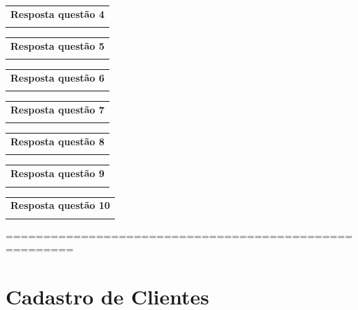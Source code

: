 \documentclass[
]{book}
\begin{document}
\begin{longtable}[]{@{}l@{}}
\toprule\noalign{}
\endhead
\bottomrule\noalign{}
\endlastfoot
\textbf{Resposta questão 4} \\
 \\
\end{longtable}

\begin{longtable}[]{@{}l@{}}
\toprule\noalign{}
\endhead
\bottomrule\noalign{}
\endlastfoot
\textbf{Resposta questão 5} \\
 \\
\end{longtable}

\begin{longtable}[]{@{}l@{}}
\toprule\noalign{}
\endhead
\bottomrule\noalign{}
\endlastfoot
\textbf{Resposta questão 6} \\
 \\
\end{longtable}

\begin{longtable}[]{@{}l@{}}
\toprule\noalign{}
\endhead
\bottomrule\noalign{}
\endlastfoot
\textbf{Resposta questão 7} \\
 \\
\end{longtable}

\begin{longtable}[]{@{}l@{}}
\toprule\noalign{}
\endhead
\bottomrule\noalign{}
\endlastfoot
\textbf{Resposta questão 8} \\
 \\
\end{longtable}

\begin{longtable}[]{@{}l@{}}
\toprule\noalign{}
\endhead
\bottomrule\noalign{}
\endlastfoot
\textbf{Resposta questão 9} \\
 \\
\end{longtable}

\begin{longtable}[]{@{}l@{}}
\toprule\noalign{}
\endhead
\bottomrule\noalign{}
\endlastfoot
\textbf{Resposta questão 10} \\
 \\
\end{longtable}

=======================================================

\section{Cadastro de Clientes}\label{cadastro-de-clientes}
\end{document}
